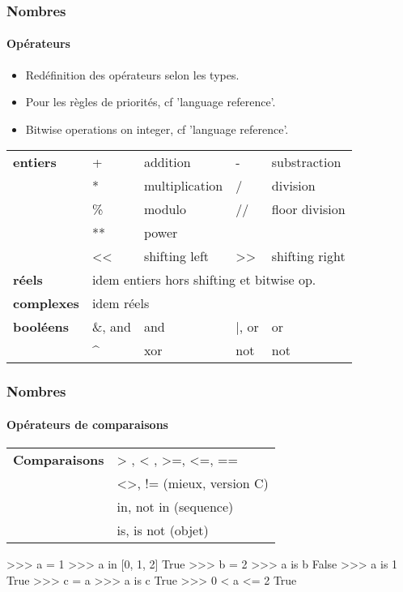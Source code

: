 \begin{frame}
\frametitle{Nombres}
\framesubtitle{Opérateurs}
\begin{itemize}
 \item Redéfinition des opérateurs selon les types. 
 \item Pour les règles de priorités, cf 'language reference'.
 \item Bitwise operations on integer, cf 'language reference'. 
\end{itemize}

\begin{tabular}{l|ll|ll}
{\bfseries entiers} & + & addition & - & substraction \\
 &  * & multiplication & / & division \\
 & \% & modulo & // & floor division \\
 & ** & power  & & \\
 & << & shifting left & >> & shifting right \\
{\bfseries réels} & \multicolumn{4}{l}{idem entiers hors shifting et bitwise op.}\\
{\bfseries complexes} & \multicolumn{4}{l}{idem réels}\\
{\bfseries booléens} & \&, and & and & |, or & or \\
 & \^\/ & xor & not & not 
\end{tabular}
\end{frame}
\begin{frame}[fragile]
\frametitle{Nombres}
\framesubtitle{Opérateurs de comparaisons}
\begin{tabular}{ll}
{\bfseries Comparaisons} & > , < , >=, <=, == \\
 & <>, != (mieux, version C) \\
 & in, not in (sequence) \\
 & is, is not (objet) 
\end{tabular}
\begin{pythonConsole}
>>> a = 1 
>>> a in [0, 1, 2]
True
>>> b = 2
>>> a is b
False
>>> a is 1
True
>>> c = a
>>> a is c
True
>>> 0 < a <= 2
True
\end{pythonConsole}
\end{frame}
